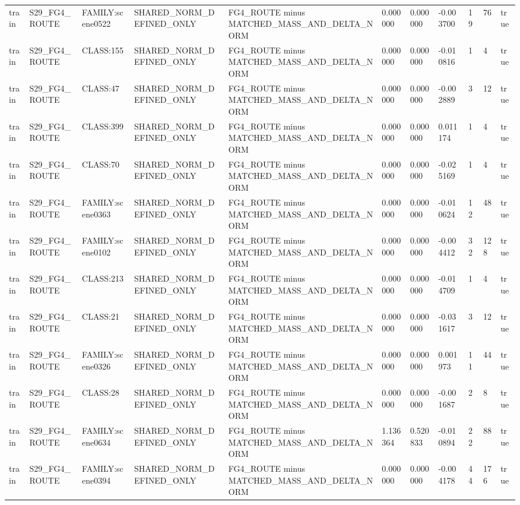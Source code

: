 \begin{tabular}{lllllllllll}
train & S29\_FG4\_ROUTE & FAMILY:scene0522 & SHARED\_NORM\_DEFINED\_ONLY & FG4\_ROUTE minus MATCHED\_MASS\_AND\_DELTA\_NORM & 0.000000 & 0.000000 & -0.003700 & 19 & 76 & true \\
train & S29\_FG4\_ROUTE & CLASS:155 & SHARED\_NORM\_DEFINED\_ONLY & FG4\_ROUTE minus MATCHED\_MASS\_AND\_DELTA\_NORM & 0.000000 & 0.000000 & -0.010816 & 1 & 4 & true \\
train & S29\_FG4\_ROUTE & CLASS:47 & SHARED\_NORM\_DEFINED\_ONLY & FG4\_ROUTE minus MATCHED\_MASS\_AND\_DELTA\_NORM & 0.000000 & 0.000000 & -0.002889 & 3 & 12 & true \\
train & S29\_FG4\_ROUTE & CLASS:399 & SHARED\_NORM\_DEFINED\_ONLY & FG4\_ROUTE minus MATCHED\_MASS\_AND\_DELTA\_NORM & 0.000000 & 0.000000 & 0.011174 & 1 & 4 & true \\
train & S29\_FG4\_ROUTE & CLASS:70 & SHARED\_NORM\_DEFINED\_ONLY & FG4\_ROUTE minus MATCHED\_MASS\_AND\_DELTA\_NORM & 0.000000 & 0.000000 & -0.025169 & 1 & 4 & true \\
train & S29\_FG4\_ROUTE & FAMILY:scene0363 & SHARED\_NORM\_DEFINED\_ONLY & FG4\_ROUTE minus MATCHED\_MASS\_AND\_DELTA\_NORM & 0.000000 & 0.000000 & -0.010624 & 12 & 48 & true \\
train & S29\_FG4\_ROUTE & FAMILY:scene0102 & SHARED\_NORM\_DEFINED\_ONLY & FG4\_ROUTE minus MATCHED\_MASS\_AND\_DELTA\_NORM & 0.000000 & 0.000000 & -0.004412 & 32 & 128 & true \\
train & S29\_FG4\_ROUTE & CLASS:213 & SHARED\_NORM\_DEFINED\_ONLY & FG4\_ROUTE minus MATCHED\_MASS\_AND\_DELTA\_NORM & 0.000000 & 0.000000 & -0.014709 & 1 & 4 & true \\
train & S29\_FG4\_ROUTE & CLASS:21 & SHARED\_NORM\_DEFINED\_ONLY & FG4\_ROUTE minus MATCHED\_MASS\_AND\_DELTA\_NORM & 0.000000 & 0.000000 & -0.031617 & 3 & 12 & true \\
train & S29\_FG4\_ROUTE & FAMILY:scene0326 & SHARED\_NORM\_DEFINED\_ONLY & FG4\_ROUTE minus MATCHED\_MASS\_AND\_DELTA\_NORM & 0.000000 & 0.000000 & 0.001973 & 11 & 44 & true \\
train & S29\_FG4\_ROUTE & CLASS:28 & SHARED\_NORM\_DEFINED\_ONLY & FG4\_ROUTE minus MATCHED\_MASS\_AND\_DELTA\_NORM & 0.000000 & 0.000000 & -0.001687 & 2 & 8 & true \\
train & S29\_FG4\_ROUTE & FAMILY:scene0634 & SHARED\_NORM\_DEFINED\_ONLY & FG4\_ROUTE minus MATCHED\_MASS\_AND\_DELTA\_NORM & 1.136364 & 0.520833 & -0.010894 & 22 & 88 & true \\
train & S29\_FG4\_ROUTE & FAMILY:scene0394 & SHARED\_NORM\_DEFINED\_ONLY & FG4\_ROUTE minus MATCHED\_MASS\_AND\_DELTA\_NORM & 0.000000 & 0.000000 & -0.004178 & 44 & 176 & true \\

\end{tabular}
